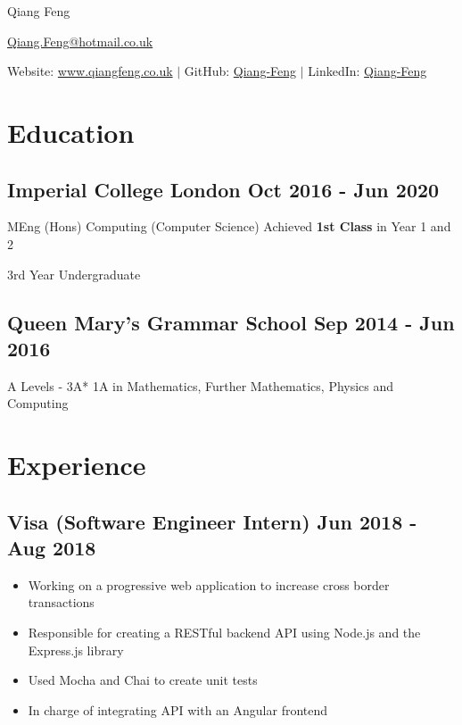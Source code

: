 \documentclass[a4paper]{article}
\begin{document}
\begin{center}
    {\huge Qiang Feng}

    \vspace{2pt}

    \href{mailto:Qiang.Feng@hotmail.co.uk}{Qiang.Feng@hotmail.co.uk}

    \vspace{2pt}

    Website: \href{https://www.qiangfeng.co.uk}{www.qiangfeng.co.uk} $\mid$
    GitHub: \href{https://github.com/Qiang-Feng}{Qiang-Feng} $\mid$
    LinkedIn: \href{https://www.linkedin.com/in/qiang-feng/}{Qiang-Feng}
\end{center}

\section*{Education}

\subsection*{Imperial College London \hfill Oct 2016 - Jun 2020}

MEng (Hons) Computing (Computer Science) \hfill Achieved \textbf{1st Class} in Year 1 and 2

3rd Year Undergraduate

\subsection*{Queen Mary's Grammar School \hfill Sep 2014 - Jun 2016}

A Levels - 3A* 1A in Mathematics, Further Mathematics, Physics and Computing

\section*{Experience}

\subsection*{Visa \textnormal{(Software Engineer Intern)} \hfill Jun 2018 - Aug 2018}

\begin{itemize}
    \item Working on a progressive web application to increase cross border transactions
    \item Responsible for creating a RESTful backend API using Node.js and the Express.js library
    \item Used Mocha and Chai to create unit tests
    \item In charge of integrating API with an Angular frontend
\end{itemize}
\end{document}
